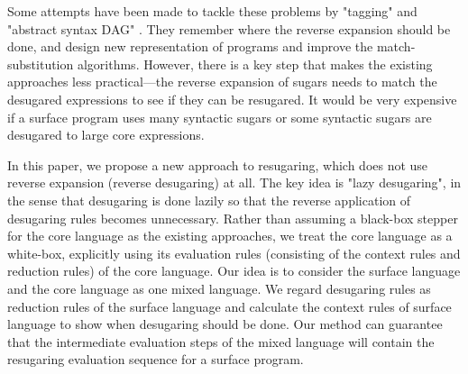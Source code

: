 Some attempts have been made to tackle these problems by "tagging" \cite{resugaring} and "abstract syntax DAG" \cite{hygienic}.
They remember where the reverse expansion should be done, and design new representation of programs and improve the match-substitution algorithms.
However, there is a key step that makes the existing approaches less practical---the reverse expansion of sugars needs to match the desugared expressions to see if they can be resugared. It would be very expensive if a surface program uses many syntactic sugars or some syntactic sugars are desugared to large core expressions.



\label{mark:mention}
In this paper, we propose a new approach to resugaring, which does not use reverse expansion (reverse desugaring) at all.
The key idea is "lazy desugaring", in the sense that desugaring is done lazily  so that the reverse application of desugaring rules becomes unnecessary. Rather than assuming a black-box stepper for the core language as the existing approaches, we treat the core language as a white-box, explicitly using
its evaluation rules (consisting of the context rules and reduction rules) of the core language.
Our idea is to consider the surface language and the core language as one mixed language. We regard desugaring rules as reduction rules of the surface language and calculate the context rules of surface language to show when desugaring
should be done. Our method can guarantee that the intermediate evaluation steps of the mixed language will contain the resugaring evaluation sequence for a surface program.

